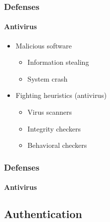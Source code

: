 \documentclass{beamer}
\begin{document}
		\begin{frame}
		\frametitle{Defenses}
		\framesubtitle{Antivirus}
		\begin{itemize}
		\setlength\itemsep{1.5em}
			\item Malicious software
			\begin{itemize}
			\setlength\itemsep{0.5em}
				\item Information stealing
				\item System crash
			\end{itemize}

			\item Fighting heuristics (antivirus)
			\begin{itemize}
			\setlength\itemsep{0.5em}
				\item Virus scanners
				\item Integrity checkers
				\item Behavioral checkers
			\end{itemize}
		\end{itemize}
		\end{frame}

		\begin{frame}
		\frametitle{Defenses}
		\framesubtitle{Antivirus}
		\end{frame}
		
	\subsection{Authentication}
\end{document}
